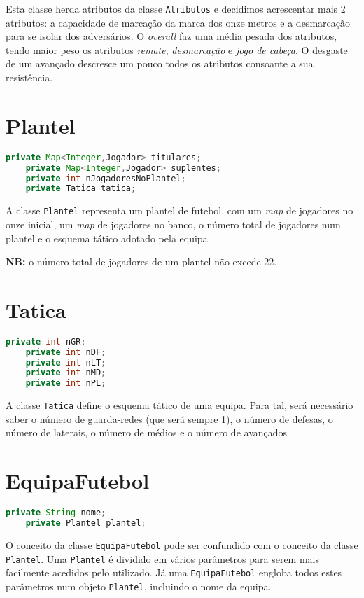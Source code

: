 \documentclass[a4paper]{report}
\begin{document}
    Esta classe herda atributos da classe \texttt{Atributos} e decidimos acrescentar mais 2 atributos: a capacidade de marcação da marca dos onze metros e a desmarcação para se isolar dos adversários.
    O \textit{overall} faz uma média pesada dos atributos, tendo maior peso os atributos \textit{remate}, \textit{desmarcação} e \textit{jogo de cabeça}. O desgaste de um avançado descresce um pouco todos os atributos consoante a sua resistência.
    
	\section{Plantel}
	
	\begin{lstlisting}[language=Java]
    private Map<Integer,Jogador> titulares; 
    private Map<Integer,Jogador> suplentes; 
    private int nJogadoresNoPlantel; 
    private Tatica tatica; 
	\end{lstlisting}
    
    A classe \texttt{Plantel} representa um plantel de futebol, com um \textit{map} de jogadores no onze inicial,
    um \textit{map} de jogadores no banco, o número total de jogadores num plantel e o esquema tático adotado pela equipa. \par \textbf{NB:} o número total de jogadores de um plantel não excede 22.
	 
	
	\section{Tatica}
	\begin{lstlisting}[language=Java]
    private int nGR;
    private int nDF;
    private int nLT;
    private int nMD;
    private int nPL;
	\end{lstlisting}
    A classe \texttt{Tatica} define o esquema tático de uma equipa. Para tal, será necessário saber o número de guarda-redes (que será sempre 1), o número de defesas, o número de laterais, o número de médios e o número de avançados
	
	\section{EquipaFutebol}
	\begin{lstlisting}[language=Java]
    private String nome;
    private Plantel plantel;
	\end{lstlisting}
    O conceito da classe \texttt{EquipaFutebol} pode ser confundido com o conceito da classe
    \texttt{Plantel}. 
    Uma \texttt{Plantel} é dividido em vários parâmetros para serem mais facilmente acedidos pelo
    utilizado. 
    Já uma \texttt{EquipaFutebol} engloba todos estes parâmetros num objeto \texttt{Plantel}, incluindo o nome da equipa.
	
\end{document}
